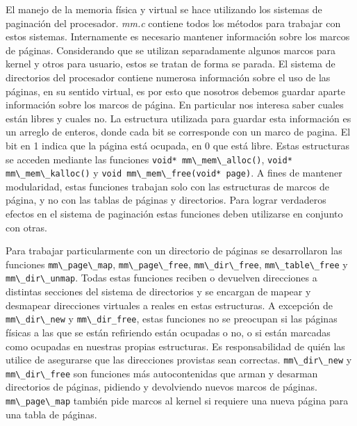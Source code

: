 \documentclass[a4paper]{article}
\newcommand{\file}[1]{\textit{#1}}
\newcommand{\func}[1]{\lstinline{#1}}
\begin{document}
El manejo de la memoria física y virtual se hace utilizando los sistemas de paginación del procesador. \file{mm.c} contiene todos los métodos para trabajar con estos sistemas. Internamente es necesario mantener información sobre los marcos de páginas. Considerando que se utilizan separadamente algunos marcos para kernel y otros para usuario, estos se tratan de forma se parada. El sistema de directorios del procesador contiene numerosa información sobre el uso de las páginas, en su sentido virtual, es por esto que nosotros debemos guardar aparte información sobre los marcos de página. En particular nos interesa saber cuales están libres y cuales no. La estructura utilizada para guardar esta información es un arreglo de enteros, donde cada bit se corresponde con un marco de pagina. El bit en 1 indica que la página está ocupada, en 0 que está libre. Estas estructuras se acceden mediante las funciones \func{void* mm\_mem\_alloc()}, \func{void* mm\_mem\_kalloc()} y \func{void mm\_mem\_free(void* page)}. A fines de mantener modularidad, estas funciones trabajan solo con las estructuras de marcos de página, y no con las tablas de páginas y directorios. Para lograr verdaderos efectos en el sistema de paginación estas funciones deben utilizarse en conjunto con otras.

Para trabajar particularmente con un directorio de páginas se desarrollaron las funciones \func{mm\_page\_map}, \func{mm\_page\_free}, \func{mm\_dir\_free}, \func{mm\_table\_free} y \func{mm\_dir\_unmap}. Todas estas funciones reciben o devuelven direcciones a distintas secciones del sistema de directorios y se encargan de mapear y desmapear direcciones virtuales a reales en estas estructuras. A excepción de \func{mm\_dir\_new} y \func{mm\_dir_free}, estas funciones no se preocupan si las páginas físicas a las que se están refiriendo están ocupadas o no, o si están marcadas como ocupadas en nuestras propias estructuras. Es responsabilidad de quién las utilice de asegurarse que las direcciones provistas sean correctas. \func{mm\_dir\_new} y \func{mm\_dir\_free} son funciones más autocontenidas que arman y desarman directorios de páginas, pidiendo y devolviendo nuevos marcos de páginas. \func{mm\_page\_map} también pide marcos al kernel si requiere una nueva página para una tabla de páginas. 
\end{document}
